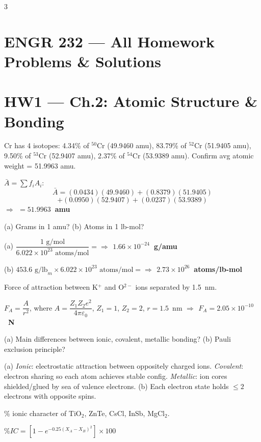 \documentclass[8pt,letterpaper]{extarticle}
\newcommand{\prob}[1]{\smallskip\noindent{\footnotesize\bfseries\color{black!80} #1\quad}}
\newcommand{\soln}{\noindent{\footnotesize\itshape\color{blue!50!black}Sol: }}
\newcommand{\ans}[1]{{\footnotesize\bfseries\color{green!40!black}$\Rightarrow$ #1}}
\begin{document}
\begin{multicols*}{3}

\section*{\small ENGR 232 — All Homework Problems \& Solutions}

\section*{HW1 — Ch.2: Atomic Structure \& Bonding}

\prob{2.2} Cr has 4 isotopes: 4.34\% of $^{50}$Cr (49.9460 amu), 83.79\% of $^{52}$Cr (51.9405 amu), 9.50\% of $^{53}$Cr (52.9407 amu), 2.37\% of $^{54}$Cr (53.9389 amu). Confirm avg atomic weight = 51.9963 amu.

\soln $\bar{A} = \sum f_i A_i$:
\[
  \bar{A} = (0.0434)(49.9460)+(0.8379)(51.9405)
\]
\[
  +(0.0950)(52.9407)+(0.0237)(53.9389)
\]
\ans{$= 51.9963$~amu \checkmark}

\prob{2.5} (a) Grams in 1 amu? (b) Atoms in 1 lb-mol?

\soln (a) $\dfrac{1\text{ g/mol}}{6.022\times10^{23}\text{ atoms/mol}} = $\ans{$1.66\times10^{-24}$~g/amu}

(b) $453.6\text{ g/lb}_m \times 6.022\times10^{23}\text{ atoms/mol} = $\ans{$2.73\times10^{26}$~atoms/lb-mol}

\prob{2.15} Force of attraction between K$^+$ and O$^{2-}$ ions separated by 1.5~nm.

\soln $F_A = \dfrac{A}{r^2}$, where $A = \dfrac{Z_1 Z_2 e^2}{4\pi\varepsilon_0}$, $Z_1=1$, $Z_2=2$, $r=1.5$~nm
\ans{$F_A = 2.05\times10^{-10}$~N}

\prob{2.22} (a) Main differences between ionic, covalent, metallic bonding? (b) Pauli exclusion principle?

\soln (a) \textit{Ionic}: electrostatic attraction between oppositely charged ions. \textit{Covalent}: electron sharing so each atom achieves stable config. \textit{Metallic}: ion cores shielded/glued by sea of valence electrons.
(b) Each electron state holds $\leq2$ electrons with opposite spins.

\prob{2.25} \% ionic character of TiO$_2$, ZnTe, CsCl, InSb, MgCl$_2$.

\soln $\%IC = \left[1-e^{-0.25(X_A-X_B)^2}\right]\times100$


\end{multicols*}
\end{document}
